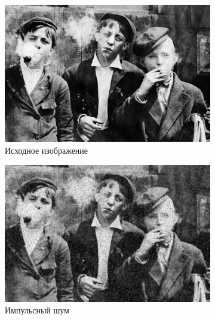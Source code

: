 \begin{figure}[ht] 
    \centering
    \begin{subfigure}[b]{0.5\linewidth}
        \centering
        \includegraphics[width=0.95\linewidth]{../lewis-hine-taschen-main-3.jpg} 
        \caption{Исходное изображение} 
        \label{wiener_5:a} 
        \vspace{4ex}
    \end{subfigure}%
    \begin{subfigure}[b]{0.5\linewidth}
      \centering
      \includegraphics[width=0.95\linewidth]{../Wiener_Filter/Wiener_Impulse_noise_(k=5).jpg} 
      \caption{Импульсный шум} 
      \label{weiner_5:b} 
      \vspace{4ex}
    \end{subfigure}
    \begin{subfigure}[b]{0.5\linewidth}
      \centering

\end{subfigure}
\end{figure}
